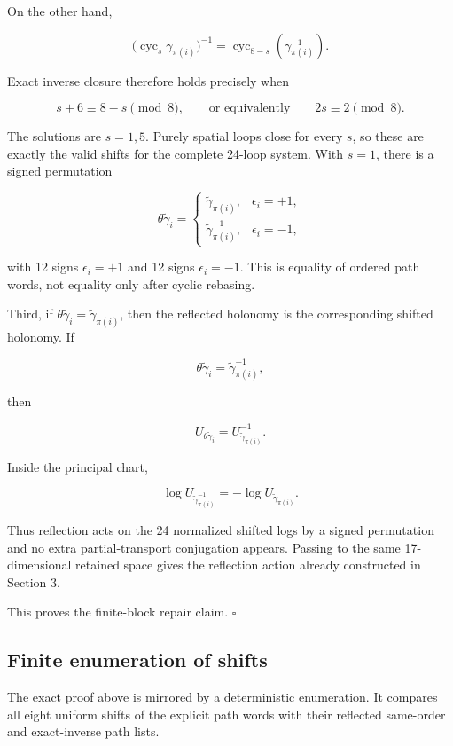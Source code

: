 \documentclass[10pt]{article}
\begin{document}
On the other hand,

\[
\bigl(\operatorname{cyc}_s\gamma_{\pi(i)}\bigr)^{-1}
=
\operatorname{cyc}_{8-s}(\gamma_{\pi(i)}^{-1}).
\]

Exact inverse closure therefore holds precisely when

\[
s+6\equiv8-s\pmod8,
\qquad\text{or equivalently}\qquad
2s\equiv2\pmod8.
\]

The solutions are \(s=1,5\).  Purely spatial loops close for every \(s\), so these are exactly the valid shifts for the complete 24-loop system.  With \(s=1\), there is a signed permutation

\[
\theta\widetilde\gamma_i
=
\begin{cases}
\widetilde\gamma_{\pi(i)}, & \epsilon_i=+1,\\
\widetilde\gamma_{\pi(i)}^{-1}, & \epsilon_i=-1,
\end{cases}
\]

with 12 signs \(\epsilon_i=+1\) and 12 signs \(\epsilon_i=-1\).  This is equality of ordered path words, not equality only after cyclic rebasing.

Third, if \(\theta\widetilde\gamma_i=\widetilde\gamma_{\pi(i)}\), then the reflected holonomy is the corresponding shifted holonomy.  If

\[
\theta\widetilde\gamma_i=\widetilde\gamma_{\pi(i)}^{-1},
\]

then

\[
U_{\theta\widetilde\gamma_i}
=
U_{\widetilde\gamma_{\pi(i)}}^{-1}.
\]

Inside the principal chart,

\[
\log U_{\widetilde\gamma_{\pi(i)}^{-1}}
=
-\log U_{\widetilde\gamma_{\pi(i)}}.
\]

Thus reflection acts on the 24 normalized shifted logs by a signed permutation and no extra partial-transport conjugation appears.  Passing to the same 17-dimensional retained space gives the reflection action already constructed in Section 3.

This proves the finite-block repair claim.  \(\square\)

\subsection{Finite enumeration of shifts}

The exact proof above is mirrored by a deterministic enumeration.  It compares all eight uniform shifts of the explicit path words with their reflected same-order and exact-inverse path lists.
\end{document}
